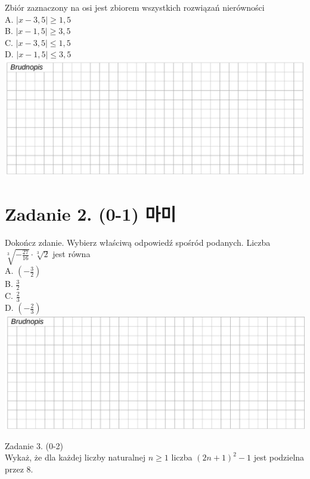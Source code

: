 \documentclass[10pt]{article}
\begin{document}
Zbiór zaznaczony na osi jest zbiorem wszystkich rozwiązań nierówności\\
A. \(|x-3,5| \geq 1,5\)\\
B. \(|x-1,5| \geq 3,5\)\\
C. \(|x-3,5| \leq 1,5\)\\
D. \(|x-1,5| \leq 3,5\)\\
\includegraphics[max width=\textwidth, center]{2024_11_21_51cb67544fb9b029f01cg-04(2)}

\section*{Zadanie 2. (0-1) 마미}
Dokończ zdanie. Wybierz właściwą odpowiedź spośród podanych. Liczba \(\sqrt[3]{-\frac{27}{16}} \cdot \sqrt[3]{2}\) jest równa\\
A. \(\left(-\frac{3}{2}\right)\)\\
B. \(\frac{3}{2}\)\\
C. \(\frac{2}{3}\)\\
D. \(\left(-\frac{2}{3}\right)\)\\
\includegraphics[max width=\textwidth, center]{2024_11_21_51cb67544fb9b029f01cg-04(1)}

Zadanie 3. (0-2)\\
Wykaż, że dla każdej liczby naturalnej \(n \geq 1\) liczba \((2 n+1)^{2}-1\) jest podzielna przez 8.
\end{document}
